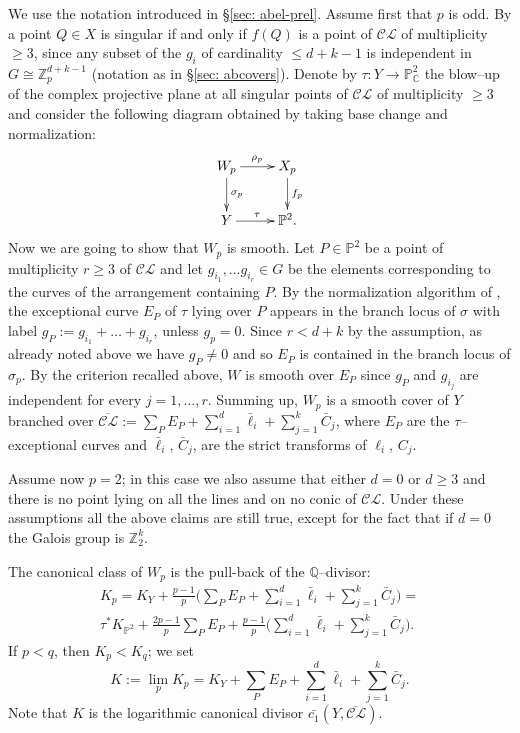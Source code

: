 \documentclass[12pt]{amsart}
\theoremstyle{plain}
\theoremstyle{definition}
\newcommand\pp[1]{\todo[color=cyan!50]{#1}} %
\renewcommand\ge{\geqslant}
\renewcommand\geq{\geqslant}
\renewcommand\le{\leqslant}
\newcommand\CL{\mathcal{CL}}
\newcommand\oCL{\overline{\mathcal{CL}}}
\renewcommand\pp{\mathbb P}
\newcommand{\Z}{\mathbb Z}
\begin{document}
 We use the notation introduced in \S \ref{sec: abel-prel}. Assume first that $p$ is odd. By \cite[Proposition~3.1]{RP} a point $Q \in X$ is singular if and only if $f(Q)$ is a point of $\mathcal{CL}$ of multiplicity $\geq 3$, since any subset of the $g_i$ of cardinality $\le d+k-1$ is independent in $G\cong \mathbb{Z}_p^{d+k-1}$ (notation as in \S \ref{sec: abcovers}). Denote by $\tau \colon Y \rightarrow \mathbb{P}^{2}_{\mathbb{C}}$ the blow--up of the complex projective plane at all singular points of $\mathcal{CL}$ of multiplicity $\geq 3$ and consider the following diagram obtained by taking base change and normalization:
\begin{equation}\label{eq: diag1}
\xymatrix{
W_p\ar[d]^{\sigma_p} \ar[r]^{\rho_p}&X_p\ar[d]^{f_p}\\
Y \ar[r]^{\tau}         & \pp^2  .}
\end{equation}
Now we are going to show that $W_{p}$ is smooth. Let $P\in \pp^2$ be a point of multiplicity $r \geq 3$ of $\mathcal{CL}$ and let $g_{i_1},\dots g_{i_r}\in G$ be the elements corresponding to the curves of the arrangement containing $P$. By the normalization algorithm of \cite[\S~3]{RP}, the exceptional curve $E_P$ of $\tau$ lying over $P$ appears in the branch locus of $\sigma$ with label $g_P:= g_{i_1}+ \dots + g_{i_r}$, unless $g_p=0$. Since $r<d+k$ by the assumption, as already noted above we have $g_P\ne 0$ and so $E_P$ is contained in the branch locus of $\sigma_p$. By the criterion recalled above, $W$ is smooth over $E_P$ since $g_P$ and $g_{i_j}$ are independent for every $j=1, \dots, r$.  Summing up, $W_p$ is a smooth cover of $Y$ branched over $\oCL:=\sum_PE_P+\sum_{i=1}^d\bar \ell_i+\sum_{j=1}^k\bar C_j$, where $E_P$ are the $\tau$--exceptional curves and $\bar \ell_i$, $\bar C_j$, are the strict transforms of $\ell_i$, $C_j$.

Assume now $p=2$; in this case we also assume that either $d=0$ or $d\ge 3$ and there is no point lying on all the lines and on no conic of $\CL$. Under these assumptions all the above claims are still true, except for the fact that if $d=0$ the Galois group is $\Z_2^k$. 

The canonical class of $W_p$ is the pull-back of the $\mathbb Q$--divisor:
\begin{multline}\label{eq: Kp}
K_p=K_Y +\frac{p-1}{p} \bigg( \sum_PE_P+\sum_{i=1}^d\bar \ell_i+\sum_{j=1}^k\bar C_j \bigg) =\\ \tau^*K_{\pp^2}+\frac{2p-1}{p}\sum_PE_P+\frac{p-1}{p}\bigg(\sum_{i=1}^d\bar \ell_i+\sum_{j=1}^k\bar C_j \bigg).
\end{multline}
If $p<q$, then $K_p<K_q$; we  set  $$K:=\lim_pK_p=K_Y+\sum_PE_P+\sum_{i=1}^d\bar \ell_i+\sum_{j=1}^k\bar C_j.$$ Note that $K$  is  the logarithmic canonical divisor $\bar {c_1}(Y, \overline{\mathcal{CL}})$.
\end{document}
